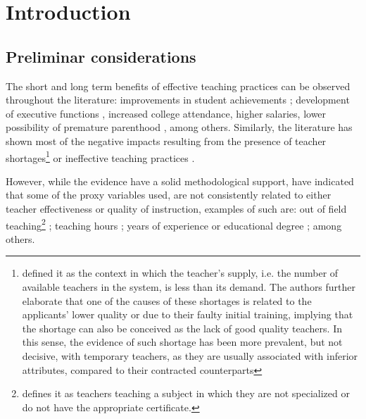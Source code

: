 \chapter{Introduction}

\section{Preliminar considerations}

The short and long term benefits of effective teaching practices can be observed throughout the literature: improvements in student achievements \cite{Rockoff_2004, Rivkin_et_al_2005, Duflo_et_al_2009, Hanushek_et_al_2012, Muralidharan_et_al_2013, Chetty_et_al_2014a, Araujo_et_al_2016}; development of executive functions \citep{Araujo_et_al_2016}, increased college attendance, higher salaries, lower possibility of premature parenthood \citep{Chetty_et_al_2014b}, among others. Similarly, the literature has shown most of the negative impacts resulting from the presence of teacher shortages\footnote{\citet{Bertoni_et_al_2020a} defined it as the context in which the teacher's supply, i.e. the number of available teachers in the system, is less than its demand. The authors further elaborate that one of the causes of these shortages is related to the applicants' lower quality or due to their faulty initial training, implying that the shortage can also be conceived as the lack of good quality teachers. In this sense, the evidence of such shortage has been more prevalent, but not decisive, with temporary teachers, as they are usually associated with inferior attributes, compared to their contracted counterparts} \citep{Duflo_et_al_2009, Muralidharan_et_al_2013, Duflo_et_al_2015, Ayala_2017, Marotta_2019} or ineffective teaching practices \citep{Hanushek_et_al_2012}.

However, while the evidence have a solid methodological support, \citet{Hanushek_et_al_2006} have indicated that some of the proxy variables used, are not consistently related to either teacher effectiveness or quality of instruction, examples of such are: out of field teaching\footnote{\citet{Medeiros_et_al_2018} defines it as teachers teaching a subject in which they are not specialized or do not have the appropriate certificate.} \citep{Ingersoll_1998, Dee_et_al_2008, Bertoni_et_al_2020a}; teaching hours \citep{Bruns_et_al_2015}; years of experience or educational degree \citep{Rockoff_2004, Rivkin_et_al_2005, Clotfelter_et_al_2006, Clotfelter_et_al_2007, Hanushek_et_al_2012}; among others.

